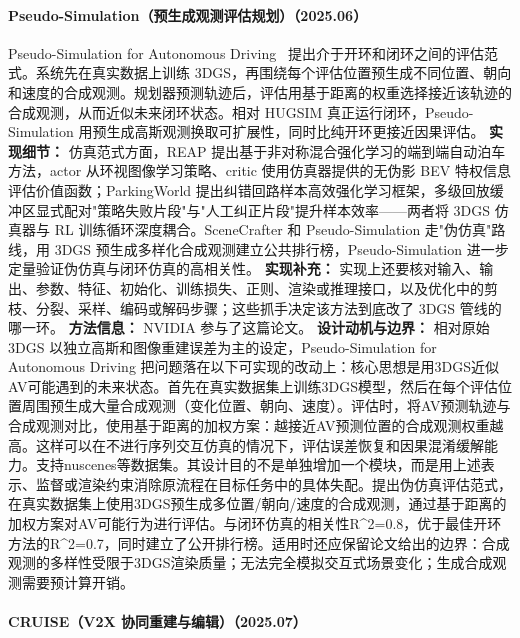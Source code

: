 \paragraph{Pseudo-Simulation（预生成观测评估规划）（2025.06）}
Pseudo-Simulation for Autonomous Driving~\cite{2506_04218} 提出介于开环和闭环之间的评估范式。系统先在真实数据上训练 3DGS，再围绕每个评估位置预生成不同位置、朝向和速度的合成观测。规划器预测轨迹后，评估用基于距离的权重选择接近该轨迹的合成观测，从而近似未来闭环状态。相对 HUGSIM 真正运行闭环，Pseudo-Simulation 用预生成高斯观测换取可扩展性，同时比纯开环更接近因果评估。
\textbf{实现细节：} 仿真范式方面，REAP 提出基于非对称混合强化学习的端到端自动泊车方法，actor 从环视图像学习策略、critic 使用仿真器提供的无伪影 BEV 特权信息评估价值函数；ParkingWorld 提出纠错回路样本高效强化学习框架，多级回放缓冲区显式配对"策略失败片段"与"人工纠正片段"提升样本效率——两者将 3DGS 仿真器与 RL 训练循环深度耦合。SceneCrafter 和 Pseudo-Simulation 走"伪仿真"路线，用 3DGS 预生成多样化合成观测建立公共排行榜，Pseudo-Simulation 进一步定量验证伪仿真与闭环仿真的高相关性。
\textbf{实现补充：} 实现上还要核对输入、输出、参数、特征、初始化、训练损失、正则、渲染或推理接口，以及优化中的剪枝、分裂、采样、编码或解码步骤；这些抓手决定该方法到底改了 3DGS 管线的哪一环。
\textbf{方法信息：} NVIDIA 参与了这篇论文。
\textbf{设计动机与边界：} 相对原始 3DGS 以独立高斯和图像重建误差为主的设定，Pseudo-Simulation for Autonomous Driving 把问题落在以下可实现的改动上：核心思想是用3DGS近似AV可能遇到的未来状态。首先在真实数据集上训练3DGS模型，然后在每个评估位置周围预生成大量合成观测（变化位置、朝向、速度）。评估时，将AV预测轨迹与合成观测对比，使用基于距离的加权方案：越接近AV预测位置的合成观测权重越高。这样可以在不进行序列交互仿真的情况下，评估误差恢复和因果混淆缓解能力。支持nuscenes等数据集。其设计目的不是单独增加一个模块，而是用上述表示、监督或渲染约束消除原流程在目标任务中的具体失配。提出伪仿真评估范式，在真实数据集上使用3DGS预生成多位置/朝向/速度的合成观测，通过基于距离的加权方案对AV可能行为进行评估。与闭环仿真的相关性R\^{}2=0.8，优于最佳开环方法的R\^{}2=0.7，同时建立了公开排行榜。适用时还应保留论文给出的边界：合成观测的多样性受限于3DGS渲染质量；无法完全模拟交互式场景变化；生成合成观测需要预计算开销。
\paragraph{CRUISE（V2X 协同重建与编辑）（2025.07）}

